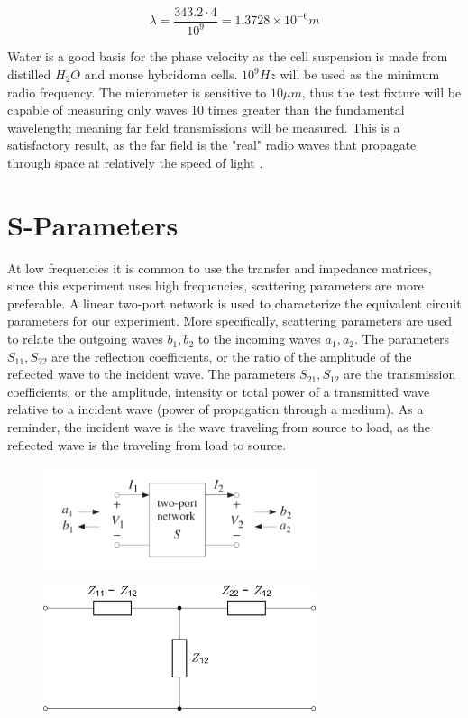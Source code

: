 \documentclass[journal]{IEEEtran}
\begin{document}
\begin{equation}
\label{near-wavelength-water}
\lambda = \frac{343.2 \cdot 4}{10^9} = 1.3728 \times 10^{-6} m
\end{equation}

Water is a good basis for the phase velocity as the cell suspension is made from distilled $H_2O$ and mouse hybridoma cells. $10^9 Hz$ will be used as the minimum radio frequency. The micrometer is sensitive to $10\mu m$, thus the test fixture will be capable of measuring only waves 10 times greater than the fundamental wavelength; meaning far field transmissions will be measured. This is a satisfactory result, as the far field is the "real" radio waves that propagate through space at relatively the speed of light \cite{near-far-em}. 

\section{S-Parameters}
At low frequencies it is common to use the transfer and impedance matrices, since this experiment uses high frequencies, scattering parameters are more preferable. A linear two-port network is used to characterize the equivalent circuit parameters for our experiment. More specifically, scattering parameters are used to relate the outgoing waves $b_1,b_2$ to the incoming waves $a_1,a_2$. The parameters $S_{11},S_{22}$ are the reflection coefficients, or the ratio of the amplitude of the reflected wave to the incident wave. The parameters $S_{21},S_{12}$ are the transmission coefficients, or the amplitude, intensity or total power of a transmitted wave relative to a incident wave (power of propagation through a medium). As a reminder, the incident wave is the wave traveling from source to load, as the reflected wave is the traveling from load to source.

\begin{figure}[ht]
\label{Equivalent_Circuit}
\includegraphics[width=8cm]{two_port.png}
\end{figure}

\begin{figure}[ht]
\label{Equivalent_Circuit}
\includegraphics[width=8cm]{Equivalent_Circuit.png}
\end{figure}
\end{document}

